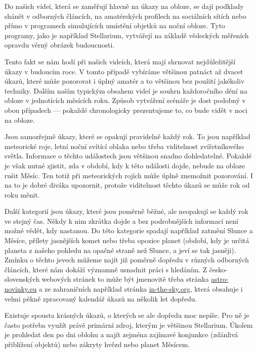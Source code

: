 \documentclass[12pt,a4paper,titlepage]{article}
\begin{document}
Do našich videí, která se zaměřují hlavně na úkazy na obloze, se dají podklady shánět v odborných článcích, na amatérských profilech na sociálních sítích nebo přímo v programech simulujících umístění objetků na noční obloze. Tyto programy, jako je například Stellarium, vytvářejí na základě vědeckých měřeních opravdu věrný obrázek budoucnosti. 

Tento fakt se nám hodí při našich videích, která mají shrnovat nejdůležitější úkazy v budoucím roce. V tomto případě vybíráme většinou patnáct až dvacet úkazů, které může pozorovat i úplný amatér a to většinou bez použití jakékoliv techniky. Dalším naším typickým obsahem videí je souhrn každoročního dění na obloze v jednotících měsících roku. Způsob vytváření scénáře je dost podobný v obou případech --- pokaždé chronologicky prezentujeme to, co bude vidět v noci na obloze.

Jsou samozřejmě úkazy, které se opakují pravidelně každý rok. To jsou například meteorické roje, letní noční svítící oblaka nebo třeba viditelnost zvířetníkového světla. Informace o těchto událostech jsou většinou snadno dohledatelné. Pokaždé je však nutné zjistit, zda v období, kdy k této události dojde, nebude na obloze rušit Měsíc. Ten totiž při meteorických rojích může úplně znemožnit pozorování. I na to je dobré diváka upozornit, protože viditelnost těchto úkazů se může rok od roku měnit.

Další kategorií jsou úkazy, které jsou poměrně běžné, ale neopakují se každý rok ve stejný čas. Někdy k nim zkrátka dojde a bez podrobnějších informací není možné vědět, kdy nastanou. Do této kategorie spadají například zatmění Slunce a Měsíce, přílety jasnějších komet nebo třeba opozice planet (období, kdy je určitá planeta z našeho pohledu na opačné straně než Slunce, a jeví se tak jasněji). Zmínku o těchto jevech můžeme najít již poměrně dopředu v různých odborných článcích, které nám dokáží významně usnadnit práci s hledáním. Z česko-slovenských webových stránek to může být jmenovitě třeba stránka \href{https://www.astro-novinky.eu}{astro-novinky.eu} a ze zahraničních například stránka \href{https://in-the-sky.org}{in-the-sky.org}, která obsahuje i velmi pěkně zpracovaný kalendář úkazů na několik let dopředu.

Existuje spousta krásných úkazů, o kterých se ale dopředu moc nepíše. Pro ně je často potřeba využít právě primární zdroj, kterým je většinou Stellarium. Úkolem je prohledat den po dni oblohu a najít zejména zajímavé konjunkce (zdánlivá přiblížení objektů) nebo zákryty hvězd nebo planet Měsícem.\@ 
\end{document}
